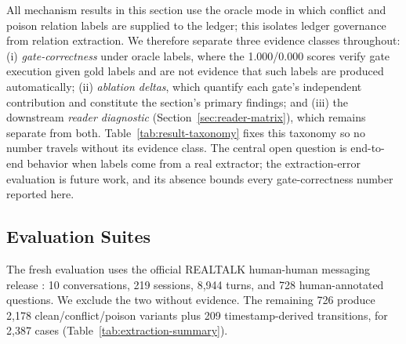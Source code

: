 All mechanism results in this section use the oracle mode in which conflict and poison relation labels are supplied to the ledger; this isolates ledger governance from relation extraction. We therefore separate three evidence classes throughout: (i) \emph{gate-correctness} under oracle labels, where the 1.000/0.000 scores verify gate execution given gold labels and are not evidence that such labels are produced automatically; (ii) \emph{ablation deltas}, which quantify each gate's independent contribution and constitute the section's primary findings; and (iii) the downstream \emph{reader diagnostic} (Section~\ref{sec:reader-matrix}), which remains separate from both. Table~\ref{tab:result-taxonomy} fixes this taxonomy so no number travels without its evidence class. The central open question is end-to-end behavior when labels come from a real extractor; the extraction-error evaluation is future work, and its absence bounds every gate-correctness number reported here.

\begin{table}[!t]
\centering
\caption{Result taxonomy used throughout this paper. Every reported number belongs to exactly one evidence class; only ablation deltas and null-control comparisons are treated as primary findings.}
\label{tab:result-taxonomy}
\end{table}

\subsection{Evaluation Suites}\label{sec:eval-suites}

The fresh evaluation uses the official REALTALK human-human messaging release \cite{realtalk2025}: 10 conversations, 219 sessions, 8,944 turns, and 728 human-annotated questions. We exclude the two without evidence. The remaining 726 produce 2,178 clean/conflict/poison variants plus 209 timestamp-derived transitions, for 2,387 cases (Table~\ref{tab:extraction-summary}).

